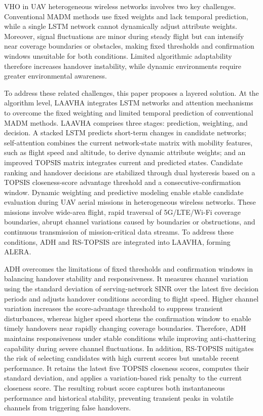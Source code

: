 \documentclass[final,3p,times,twocolumn]{elsarticle}
\begin{document}
VHO in UAV heterogeneous wireless networks involves two key challenges. Conventional MADM methods use fixed weights and lack temporal prediction, while a single LSTM network cannot dynamically adjust attribute weights. Moreover, signal fluctuations are minor during steady flight but can intensify near coverage boundaries or obstacles, making fixed thresholds and confirmation windows unsuitable for both conditions. Limited algorithmic adaptability therefore increases handover instability, while dynamic environments require greater environmental awareness.

To address these related challenges, this paper proposes a layered solution. At the algorithm level, LAAVHA integrates LSTM networks and attention mechanisms to overcome the fixed weighting and limited temporal prediction of conventional MADM methods. LAAVHA comprises three stages: prediction, weighting, and decision. A stacked LSTM predicts short-term changes in candidate networks; self-attention combines the current network-state matrix with mobility features, such as flight speed and altitude, to derive dynamic attribute weights; and an improved TOPSIS matrix integrates current and predicted states. Candidate ranking and handover decisions are stabilized through dual hysteresis based on a TOPSIS closeness-score advantage threshold and a consecutive-confirmation window. Dynamic weighting and predictive modeling enable stable candidate evaluation during UAV aerial missions in heterogeneous wireless networks. These missions involve wide-area flight, rapid traversal of 5G/LTE/Wi-Fi coverage boundaries, abrupt channel variations caused by boundaries or obstructions, and continuous transmission of mission-critical data streams. To address these conditions, ADH and RS-TOPSIS are integrated into LAAVHA, forming ALERA.

ADH overcomes the limitations of fixed thresholds and confirmation windows in balancing handover stability and responsiveness. It measures channel variation using the standard deviation of serving-network SINR over the latest five decision periods and adjusts handover conditions according to flight speed. Higher channel variation increases the score-advantage threshold to suppress transient disturbances, whereas higher speed shortens the confirmation window to enable timely handovers near rapidly changing coverage boundaries. Therefore, ADH maintains responsiveness under stable conditions while improving anti-chattering capability during severe channel fluctuations. In addition, RS-TOPSIS mitigates the risk of selecting candidates with high current scores but unstable recent performance. It retains the latest five TOPSIS closeness scores, computes their standard deviation, and applies a variation-based risk penalty to the current closeness score. The resulting robust score captures both instantaneous performance and historical stability, preventing transient peaks in volatile channels from triggering false handovers.
\end{document}
